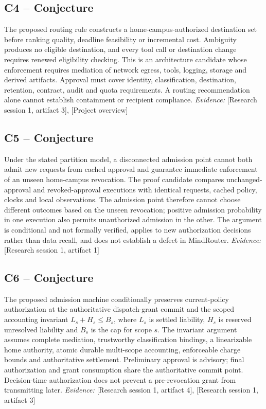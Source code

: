 \documentclass[11pt]{article}
\begin{document}
\subsection{C4 -- Conjecture}
The proposed routing rule constructs a home-campus-authorized destination set before ranking quality, deadline feasibility or incremental cost. Ambiguity produces no eligible destination, and every tool call or destination change requires renewed eligibility checking.
This is an architecture candidate whose enforcement requires mediation of network egress, tools, logging, storage and derived artifacts. Approval must cover identity, classification, destination, retention, contract, audit and quota requirements. A routing recommendation alone cannot establish containment or recipient compliance.
\textit{Evidence: }[Research session 1, artifact 3], [Project overview]
\subsection{C5 -- Conjecture}
Under the stated partition model, a disconnected admission point cannot both admit new requests from cached approval and guarantee immediate enforcement of an unseen home-campus revocation.
The proof candidate compares unchanged-approval and revoked-approval executions with identical requests, cached policy, clocks and local observations. The admission point therefore cannot choose different outcomes based on the unseen revocation; positive admission probability in one execution also permits unauthorized admission in the other. The argument is conditional and not formally verified, applies to new authorization decisions rather than data recall, and does not establish a defect in MindRouter.
\textit{Evidence: }[Research session 1, artifact 1]
\subsection{C6 -- Conjecture}
The proposed admission machine conditionally preserves current-policy authorization at the authoritative dispatch-grant commit and the scoped accounting invariant $L_s+H_s\leq B_s$, where $L_s$ is settled liability, $H_s$ is reserved unresolved liability and $B_s$ is the cap for scope $s$.
The invariant argument assumes complete mediation, trustworthy classification bindings, a linearizable home authority, atomic durable multi-scope accounting, enforceable charge bounds and authoritative settlement. Preliminary approval is advisory; final authorization and grant consumption share the authoritative commit point. Decision-time authorization does not prevent a pre-revocation grant from transmitting later.
\textit{Evidence: }[Research session 1, artifact 4], [Research session 1, artifact 3]
\end{document}
